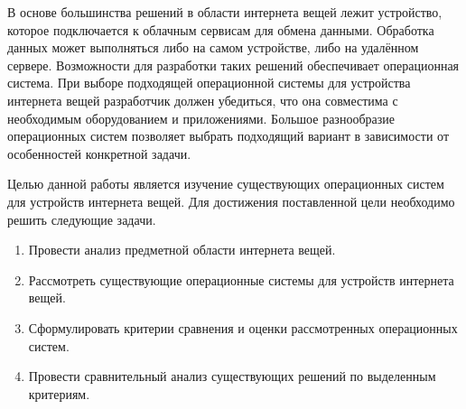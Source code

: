В основе большинства решений в области интернета вещей лежит устройство, которое подключается к облачным сервисам для обмена данными. Обработка данных может выполняться либо на самом устройстве, либо на удалённом сервере. Возможности для разработки таких решений обеспечивает операционная система. При выборе подходящей операционной системы для устройства интернета вещей разработчик должен убедиться, что она совместима с необходимым оборудованием и приложениями. Большое разнообразие операционных систем позволяет выбрать подходящий вариант в зависимости от особенностей конкретной задачи.

Целью данной работы является изучение существующих операционных систем для устройств интернета вещей. Для достижения поставленной цели необходимо решить следующие задачи.

\begin{enumerate}[label*=\arabic*.]
	\item Провести анализ предметной области интернета вещей.
	\item Рассмотреть существующие операционные системы для устройств интернета вещей.
	\item Сформулировать критерии сравнения и оценки рассмотренных операционных систем.
	\item Провести сравнительный анализ существующих решений по выделенным критериям. 
\end{enumerate}

\pagebreak